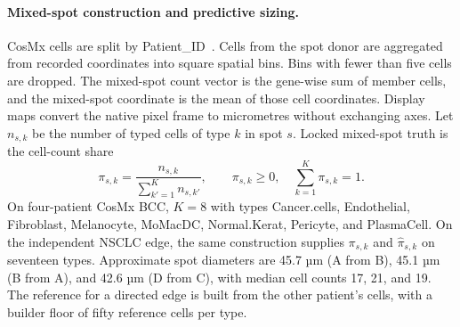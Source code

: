 \paragraph{Mixed-spot construction and predictive sizing.}
CosMx cells are split by Patient\_ID~\citep{Andreatta2024zenodo,Yerly2025preprint}. Cells from the spot donor are aggregated from recorded coordinates into square spatial bins. Bins with fewer than five cells are dropped. The mixed-spot count vector is the gene-wise sum of member cells, and the mixed-spot coordinate is the mean of those cell coordinates. Display maps convert the native pixel frame to micrometres without exchanging axes. Let \(n_{s,k}\) be the number of typed cells of type \(k\) in spot \(s\). Locked mixed-spot truth is the cell-count share
\begin{equation}
\pi_{s,k}=\frac{n_{s,k}}{\sum_{k'=1}^{K}n_{s,k'}},\qquad \pi_{s,k}\ge 0,\quad \sum_{k=1}^{K}\pi_{s,k}=1.
\label{eq:truth-frac}
\end{equation}
On four-patient CosMx BCC, \(K=8\) with types Cancer.cells, Endothelial, Fibroblast, Melanocyte, MoMacDC, Normal.Kerat, Pericyte, and PlasmaCell. On the independent NSCLC edge, the same construction supplies \(\pi_{s,k}\) and \(\hat\pi_{s,k}\) on seventeen types. Approximate spot diameters are 45.7 µm (A from B), 45.1 µm (B from A), and 42.6 µm (D from C), with median cell counts 17, 21, and 19. The reference for a directed edge is built from the other patient's cells, with a builder floor of fifty reference cells per type.

